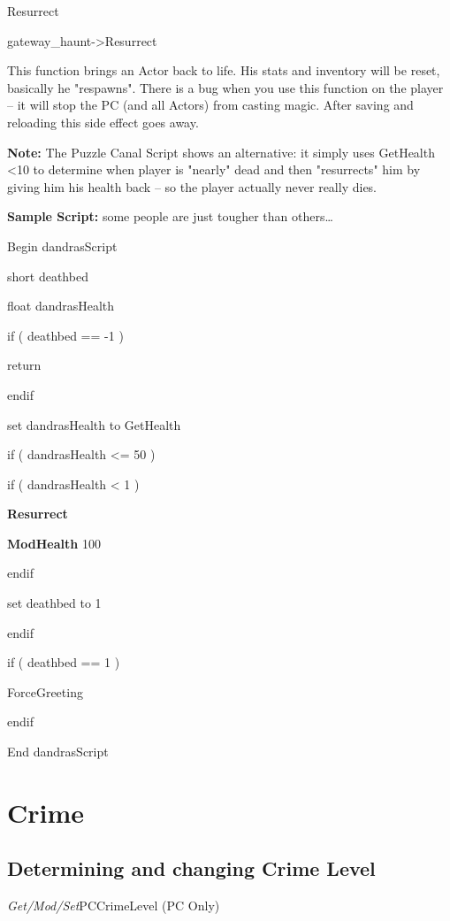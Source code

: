 \documentclass[
]{article}
\begin{document}
Resurrect

gateway\_haunt-\textgreater Resurrect

This function brings an Actor back to life. His stats and inventory will
be reset, basically he "respawns". There is a bug when you use this
function on the player -- it will stop the PC (and all Actors) from
casting magic. After saving and reloading this side effect goes away.

\textbf{Note:} The Puzzle Canal Script shows an alternative: it simply
uses GetHealth \textless10 to determine when player is "nearly" dead and
then "resurrects" him by giving him his health back -- so the player
actually never really dies.

\textbf{Sample Script:} some people are just tougher than others\ldots{}

Begin dandrasScript

short deathbed

float dandrasHealth

if ( deathbed == -1 )

return

endif

set dandrasHealth to GetHealth

if ( dandrasHealth \textless= 50 )

if ( dandrasHealth \textless{} 1 )

\textbf{Resurrect}

\textbf{ModHealth} 100

endif

set deathbed to 1

endif

if ( deathbed == 1 )

ForceGreeting

endif

End dandrasScript

\hypertarget{crime}{%
\section{\texorpdfstring{\hfill\break
Crime}{ Crime}}\label{crime}}

\hypertarget{determining-and-changing-crime-level}{%
\subsection{Determining and changing Crime
Level}\label{determining-and-changing-crime-level}}

\emph{Get/Mod/Set}PCCrimeLevel (PC Only)
\end{document}

